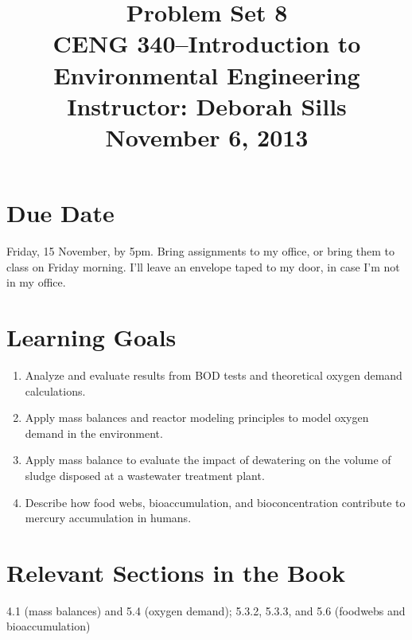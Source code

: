 \documentclass[12pt,letterpaper]{article}
\begin{document}
\setlength{\parindent}{0cm} 


\frenchspacing


\title {\Large{\textbf{Problem Set 8}}\\ \large{CENG 340--Introduction to Environmental Engineering\\
Instructor: Deborah Sills\\ \textbf{November 6, 2013}}}

\author {}
\date {}
\maketitle

\vspace{-1in}




\section *{Due Date}
Friday, 15 November, by 5pm.  Bring assignments to my office, or bring them to class on Friday morning.  I'll leave an envelope taped to my door, in case I'm not in my office.

\section *{Learning Goals}
\begin{enumerate}

\item Analyze and evaluate results from BOD tests and theoretical oxygen demand calculations.
\item Apply mass balances and reactor modeling principles to model oxygen demand in the environment.
\item Apply mass balance to evaluate the impact of dewatering on the volume of sludge disposed at a wastewater treatment plant.
\item Describe how food webs, bioaccumulation, and bioconcentration contribute to mercury accumulation in humans. 

\end{enumerate}

\section *{Relevant Sections in the Book}
4.1 (mass balances) and 5.4 (oxygen demand); 5.3.2, 5.3.3, and 5.6 (foodwebs and bioaccumulation)
\end{document}
